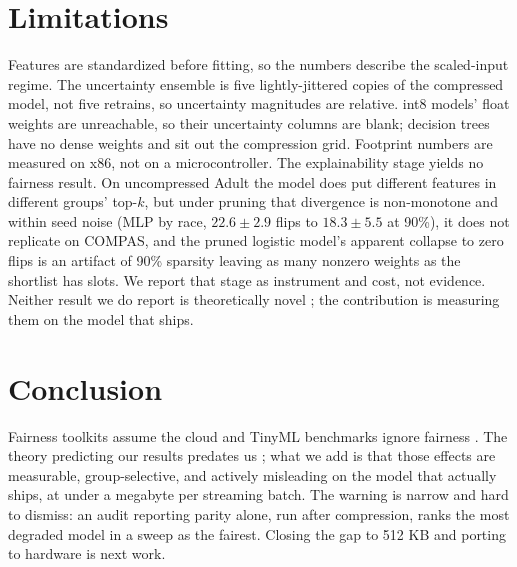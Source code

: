 \documentclass{article}
\begin{document}
\section{Limitations}
\label{sec:limitations}

Features are standardized before fitting, so the numbers describe the scaled-input regime. The uncertainty ensemble is five lightly-jittered copies of the compressed model, not five retrains, so uncertainty magnitudes are relative. int8 models' float weights are unreachable, so their uncertainty columns are blank; decision trees have no dense weights and sit out the compression grid. Footprint numbers are measured on x86, not on a microcontroller. The explainability stage yields no fairness result. On uncompressed Adult the model does put different features in different groups' top-$k$, but under pruning that divergence is non-monotone and within seed noise (MLP by race, $22.6 \pm 2.9$ flips to $18.3 \pm 5.5$ at 90\%), it does not replicate on COMPAS, and the pruned logistic model's apparent collapse to zero flips is an artifact of 90\% sparsity leaving as many nonzero weights as the shortlist has slots. We report that stage as instrument and cost, not evidence. Neither result we do report is theoretically novel \cite{kleinberg2017,chouldechova2017,hooker2020}; the contribution is measuring them on the model that ships.

\section{Conclusion}

Fairness toolkits assume the cloud \cite{lee2021,deng2022,han2024} and TinyML benchmarks ignore fairness \cite{somvanshi2025}. The theory predicting our results predates us \cite{kleinberg2017,chouldechova2017,hooker2020}; what we add is that those effects are measurable, group-selective, and actively misleading on the model that actually ships, at under a megabyte per streaming batch. The warning is narrow and hard to dismiss: an audit reporting parity alone, run after compression, ranks the most degraded model in a sweep as the fairest. Closing the gap to 512 KB and porting to hardware is next work.
\end{document}
